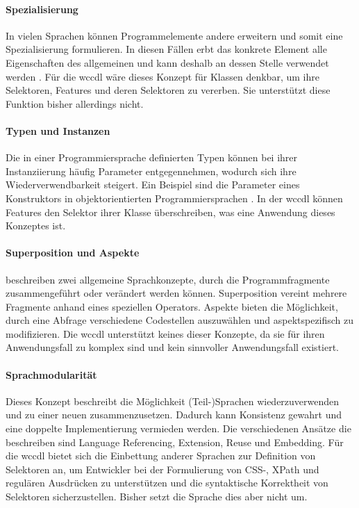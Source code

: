     \paragraph{Spezialisierung}
    In vielen Sprachen können Programmelemente andere erweitern und somit eine Spezialisierung formulieren.
    In diesen Fällen erbt das konkrete Element alle Eigenschaften des allgemeinen
    und kann deshalb an dessen Stelle verwendet werden
    \cite[Kapitel 5.1.4]{voelter:DslEngineering}.
    Für die \gls{wccdl} wäre dieses Konzept für Klassen denkbar,
    um ihre Selektoren, Features und deren Selektoren zu vererben.
    Sie unterstützt diese Funktion bisher allerdings nicht.

    \paragraph{Typen und Instanzen}
    Die in einer Programmiersprache definierten Typen können bei ihrer Instanziierung
    häufig Parameter entgegennehmen, wodurch sich ihre Wiederverwendbarkeit steigert.
    Ein Beispiel sind die Parameter eines Konstruktors in objektorientierten Programmiersprachen
    \cite[Kapitel 5.1.5]{voelter:DslEngineering}.
    In der \gls{wccdl} können Features den Selektor ihrer Klasse überschreiben,
    was eine Anwendung dieses Konzeptes ist.

    \paragraph{Superposition und Aspekte}
    \citet[Kapitel 5.1.6]{voelter:DslEngineering} beschreiben zwei
    allgemeine Sprachkonzepte, durch die Programmfragmente zusammengeführt
    oder verändert werden können.
    Superposition vereint mehrere Fragmente anhand eines speziellen Operators.
    Aspekte bieten die Möglichkeit, durch eine Abfrage verschiedene Codestellen
    auszuwählen und aspektspezifisch zu modifizieren.
    Die \gls{wccdl} unterstützt keines dieser Konzepte,
    da sie für ihren Anwendungsfall zu komplex sind und kein sinnvoller Anwendungsfall existiert.

    \paragraph{Sprachmodularität}
    Dieses Konzept beschreibt die Möglichkeit (Teil-)Sprachen wiederzuverwenden
    und zu einer neuen zusammenzusetzen.
    Dadurch kann Konsistenz gewahrt und eine doppelte Implementierung vermieden werden.
    Die verschiedenen Ansätze die \citet[Kapitel 4.6]{voelter:DslEngineering} beschreiben
    sind Language Referencing, Extension, Reuse und Embedding.
    Für die \gls{wccdl} bietet sich die Einbettung anderer Sprachen zur Definition von Selektoren an,
    um Entwickler bei der Formulierung von CSS-, XPath und regulären Ausdrücken zu unterstützen
    und die syntaktische Korrektheit von Selektoren sicherzustellen.
    Bisher setzt die Sprache dies aber nicht um.
